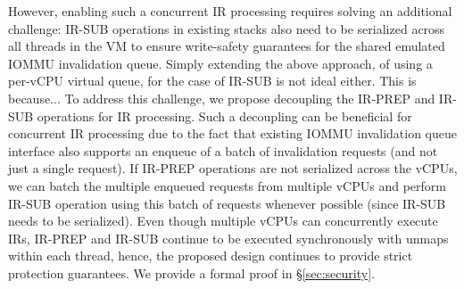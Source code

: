 However, enabling such a concurrent IR processing requires solving an additional challenge: IR-SUB operations in existing stacks also need to be serialized across all threads in the VM to ensure write-safety guarantees for the shared emulated IOMMU invalidation queue. Simply extending the above approach, of using a per-vCPU virtual queue, for the case of IR-SUB is not ideal either. This is because... 
To address this challenge, we propose decoupling the IR-PREP and IR-SUB operations for IR processing. Such a decoupling can be beneficial for concurrent IR processing due to the fact that existing IOMMU invalidation queue interface also supports an enqueue of a batch of invalidation requests (and not just a single request). If IR-PREP operations are not serialized across the vCPUs, we can batch the multiple enqueued requests from multiple vCPUs and perform IR-SUB operation using this batch of requests whenever possible (since IR-SUB needs to be serialized). Even though multiple vCPUs can concurrently execute IRs, IR-PREP and IR-SUB continue to be executed synchronously with unmaps within each thread, hence, the proposed design continues to provide strict protection guarantees. We provide a formal proof in \S\ref{sec:security}. 
